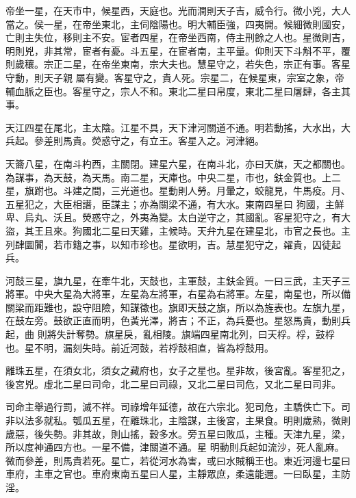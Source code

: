 \begin{pinyinscope}
 帝坐一星，在天市中，候星西，天庭也。光而潤則天子吉，威令行。微小兇，大人當之。侯一星，在帝坐東北，主伺陰陽也。明大輔臣強，四夷開。候細微則國安，亡則主失位，移則主不安。宦者四星，在帝坐西南，侍主刑餘之人也。星微則吉，明則兇，非其常，宦者有憂。斗五星，在宦者南，主平量。仰則天下斗斛不平，覆則歲穰。宗正二星，在帝坐東南，宗大夫也。慧星守之，若失色，宗正有事。客星守動，則天子親
 屬有變。客星守之，貴人死。宗星二，在候星東，宗室之象，帝輔血脈之臣也。客星守之，宗人不和。東北二星曰帛度，東北二星曰屠肆，各主其事。



 天江四星在尾北，主太陰。江星不具，天下津河關道不通。明若動搖，大水出，大兵起。參差則馬貴。熒惑守之，有立王。客星入之。河津絕。



 天籥八星，在南斗杓西，主關閉。建星六星，在南斗北，亦曰天旗，天之都關也。為謀事，為天鼓，為天馬。南二星，天庫也。中央二星，市也，鈇金質也。上二星，旗跗也。斗建之間，三光道也。星動則人勞。月暈之，蛟龍見，牛馬疫。月、五星犯之，大臣相譖，臣謀主；亦為關梁不通，有大水。東南四星曰
 狗國，主鮮卑、烏丸、沃且。熒惑守之，外夷為變。太白逆守之，其國亂。客星犯守之，有大盜，其王且來。狗國北二星曰天雞，主候時。天弁九星在建星北，市官之長也。主列肆圜闠，若市籍之事，以知市珍也。星欲明，吉。慧星犯守之，糴貴，囚徒起兵。



 河鼓三星，旗九星，在牽牛北，天鼓也，主軍鼓，主鈇金質。一曰三武，主天子三將軍。中央大星為大將軍，左星為左將軍，右星為右將軍。左星，南星也，所以備關梁而距難也，設守阻險，知謀徵也。旗即天鼓之旗，所以為旌表也。左旗九星，在鼓左旁。鼓欲正直而明，色黃光澤，將吉；不正，為兵憂也。星怒馬貴，動則兵起，曲
 則將失計奪勢。旗星戾，亂相陵。旗端四星南北列，曰天桴。桴，鼓桴也。星不明，漏刻失時。前近河鼓，若桴鼓相直，皆為桴鼓用。



 離珠五星，在須女北，須女之藏府也，女子之星也。星非故，後宮亂。客星犯之，後宮兇。虛北二星曰司命，北二星曰司祿，又北二星曰司危，又北二星曰司非。



 司命主舉過行罰，滅不祥。司祿增年延德，故在六宗北。犯司危，主驕佚亡下。司非以法多就私。瓠瓜五星，在離珠北，主陰謀，主後宮，主果食。明則歲熟，微則歲惡，後失勢。非其故，則山搖，穀多水。旁五星曰敗瓜，主種。天津九星，梁，所以度神通四方也。一星不備，津關道不通。星
 明動則兵起如流沙，死人亂麻。微而參差，則馬貴若死。星亡，若從河水為害，或曰水賊稱王也。東近河邊七星曰車府，主車之官也。車府東南五星曰人星，主靜眾庶，柔遠能邇。一曰臥星，主防淫。




\end{pinyinscope}
